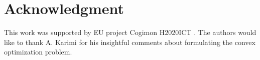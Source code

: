 \documentclass[letterpaper, 10 pt, conference,fleqn]{ieeeconf}
\begin{document}
\section*{Acknowledgment}
\footnotesize
This work was supported by EU project Cogimon H2020\textendash ICT . The authors would like to thank A. Karimi for his insightful comments about formulating the convex optimization problem.




%







\end{document}
